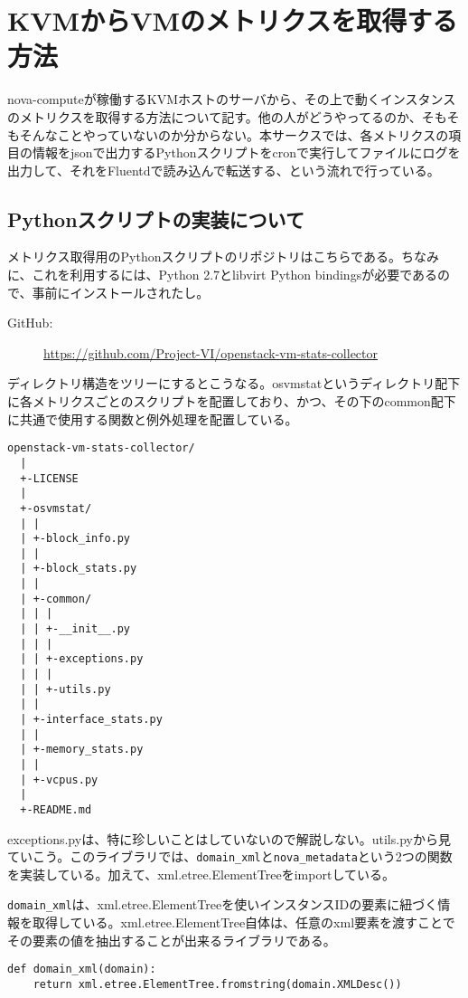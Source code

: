 \section{KVMからVMのメトリクスを取得する方法}
nova-computeが稼働するKVMホストのサーバから、その上で動くインスタンスのメトリクスを取得する方法について記す。他の人がどうやってるのか、そもそもそんなことやっていないのか分からない。本サークスでは、各メトリクスの項目の情報をjsonで出力するPythonスクリプトをcronで実行してファイルにログを出力して、それをFluentdで読み込んで転送する、という流れで行っている。

\subsection{Pythonスクリプトの実装について}
メトリクス取得用のPythonスクリプトのリポジトリはこちらである。ちなみに、これを利用するには、Python 2.7とlibvirt Python bindingsが必要であるので、事前にインストールされたし。

\begin{description}
	\item[GitHub:] \url{https://github.com/Project-VI/openstack-vm-stats-collector}
\end{description}

ディレクトリ構造をツリーにするとこうなる。osvmstatというディレクトリ配下に各メトリクスごとのスクリプトを配置しており、かつ、その下のcommon配下に共通で使用する関数と例外処理を配置している。

\begin{lstlisting}
openstack-vm-stats-collector/
  |
  +-LICENSE
  |
  +-osvmstat/
  | |
  | +-block_info.py
  | |
  | +-block_stats.py
  | |
  | +-common/
  | | |
  | | +-__init__.py
  | | |
  | | +-exceptions.py
  | | |
  | | +-utils.py
  | |
  | +-interface_stats.py
  | |
  | +-memory_stats.py
  | |
  | +-vcpus.py
  |
  +-README.md

\end{lstlisting}

exceptions.pyは、特に珍しいことはしていないので解説しない。utils.pyから見ていこう。このライブラリでは、\verb|domain_xml|と\verb|nova_metadata|という2つの関数を実装している。加えて、xml.etree.ElementTreeをimportしている。

\verb|domain_xml|は、xml.etree.ElementTreeを使いインスタンスIDの要素に紐づく情報を取得している。xml.etree.ElementTree自体は、任意のxml要素を渡すことでその要素の値を抽出することが出来るライブラリである。

\begin{lstlisting}
def domain_xml(domain):
    return xml.etree.ElementTree.fromstring(domain.XMLDesc())
\end{lstlisting}


